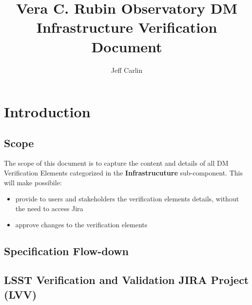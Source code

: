 \documentclass[DM,lsstdraft,STS,toc]{lsstdoc}
\begin{document}
\providecommand{\tightlist}{%
  \setlength{\itemsep}{0pt}\setlength{\parskip}{0pt}}

\def\product{LSST Data Management}


\title[DM Infrastructure Verification Document]{Vera C. Rubin Observatory DM Infrastructure Verification Document}

\author{Jeff Carlin}
\setDocRef{\lsstDocType-\lsstDocNum}
\setDocDate{\vcsDate}



\setDocUpstreamVersion{\vcsRevision}

\maketitle


\section{Introduction}\label{sec:intro}


\subsection{Scope}\label{sec:scope}

The scope of this document is to capture the content and details of all DM Verification Elements
categorized in the \textbf{Infrastrucuture} sub-component. This will make possibile:

\begin{itemize}
\item provide to users and stakeholders the verification elements details, without the need to access Jira
\item approve changes to the verification elements
\end{itemize}

\subsection{Specification Flow-down}\label{sec:sepcflowd}


\subsection{LSST Verification and Validation JIRA Project (LVV)}\label{sec:lvv}
\end{document}
